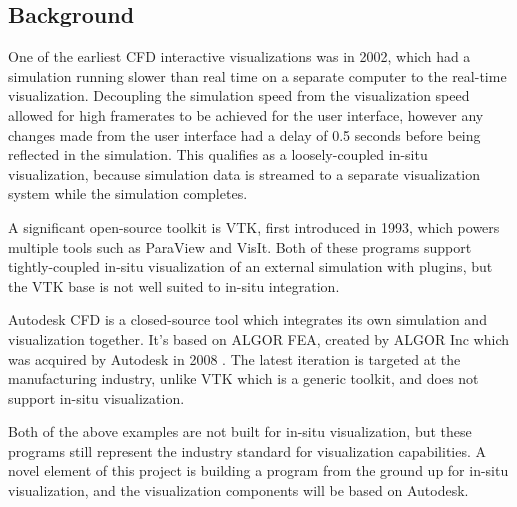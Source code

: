 \subsection{Background}




One of the earliest CFD interactive visualizations was in 2002, which had a simulation running slower than real time on a separate computer to the real-time visualization\cite{paper:2002vis:10.5555/509740.509745}.
Decoupling the simulation speed from the visualization speed allowed for high framerates to be achieved for the user interface, however any changes made from the user interface had a delay of 0.5 seconds before being reflected in the simulation.
This qualifies as a loosely-coupled in-situ visualization, because simulation data is streamed to a separate visualization system while the simulation completes.

A significant open-source toolkit is VTK, first introduced in 1993\cite{VTKBook}, which powers multiple tools such as ParaView and VisIt.
Both of these programs support tightly-coupled in-situ visualization of an external simulation with plugins, but the VTK base is not well suited to in-situ integration\cite{kress2017situ}.

Autodesk CFD is a closed-source tool which integrates its own simulation and visualization together.
It's based on ALGOR FEA, created by ALGOR Inc which was acquired by Autodesk in 2008 \cite{AutodeskAcquiresALGOR}.
The latest iteration is targeted at the manufacturing industry, unlike VTK which is a generic toolkit, and does not support in-situ visualization.

Both of the above examples are not built for in-situ visualization, but these programs still represent the industry standard for visualization capabilities.
A novel element of this project is building a program from the ground up for in-situ visualization, and the visualization components will be based on Autodesk.